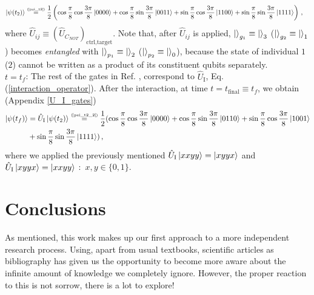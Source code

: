 \documentclass[11pt]{article}
\numberwithin{equation}{section} %
\numberwithin{figure}{section} %
\newcommand\numeq[1] %
  {\stackrel{\scriptscriptstyle(\mkern-1.5mu#1\mkern-1.5mu)}{=}}
\begin{document}
\begin{equation} \label{psi_t2_2}
\begin{split}
\ket{\psi(t_2)}
&	\numeq{\textrm{\ref{psi_t2}}} \frac{1}{2}\left( \cos\frac{\pi}{8}\cos\frac{3\pi}{8}\ket{0000} + \cos\frac{\pi}{8}\sin\frac{3\pi}{8}\ket{0011} + \sin\frac{\pi}{8}\cos\frac{3\pi}{8}\ket{1100} + \sin\frac{\pi}{8}\sin\frac{3\pi}{8}\ket{1111}\right) \,\textrm{,}\end{split}
\end{equation}
where $\hat{U}_{ij}\equiv\left(\hat{U}_{C_{NOT}}\right)_{\textrm{ctrl,target}}$. Note that, after $\hat{U}_{ij}$ is applied, $\ket{}_{g_1}\equiv\ket{}_{3}$ ($\ket{}_{g_2}\equiv\ket{}_{1}$) becomes \emph{entangled} with $\ket{}_{p_1}\equiv\ket{}_{2}$ ($\ket{}_{p_2}\equiv\ket{}_{0}$), because the state of individual $1$ ($2$) cannot be written as a product of its constituent qubits separately.\\

$t=t_f$: The rest of the gates in Ref. \cite[p.~3, Fig.~1]{QAL_IBM}, correspond to $\hat{U}_{\textrm{I}}$, Eq. (\ref{interaction_operator}). After the interaction, at time $t=t_{\textrm{final}}\equiv t_f$, we obtain $\,\,$ \cite[p.~3, l.~8]{QAL_IBM} (Appendix \ref{U_I_gates})
\begin{equation} \label{psi_t_f}
\begin{split}
\ket{\psi(t_f)}
&	= \hat{U}_{\textrm{I}}\ket{\psi(t_2)} \numeq{\textrm{\ref{psi_t2_2}}} \frac{1}{2} (\cos\frac{\pi}{8}\cos\frac{3\pi}{8}\ket{0000} + \cos\frac{\pi}{8}\sin\frac{3\pi}{8}\ket{0110} +\sin\frac{\pi}{8}\cos\frac{3\pi}{8}\ket{1001} \\
&	 +\sin\frac{\pi}{8}\sin\frac{3\pi}{8}\ket{1111})\,\textrm{,}
\end{split}
\end{equation}
where we applied the previously mentioned $\hat{U}_{\textrm{I}}\ket{xxyy}=\ket{xyyx}$ and $\hat{U}_{\textrm{I}}\ket{xyyx}=\ket{xxyy}$ $:$ $x,y\in\{0,1\}$.\\









\newpage

\section{Conclusions}

As mentioned, this work makes up our first approach to a more independent research process. Using, apart from usual textbooks, scientific articles as bibliography has given us the opportunity to    become more aware about the infinite amount of knowledge we completely ignore. However, the proper reaction to this is not sorrow, there is a lot to explore!
\end{document}

